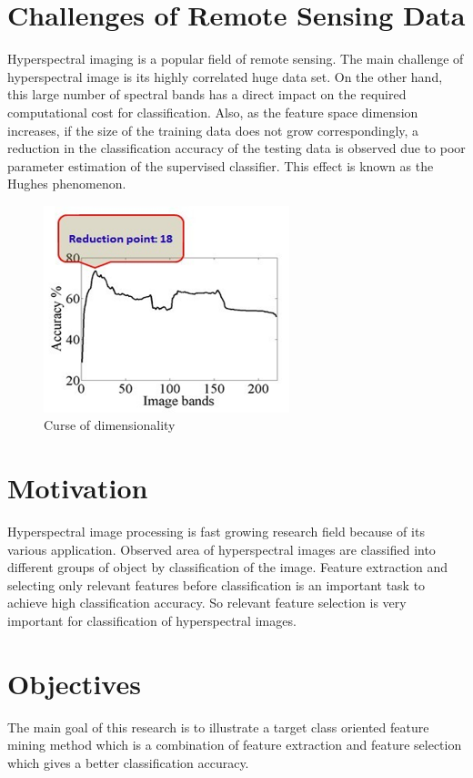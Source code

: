 \documentclass[document.tex]{subfiles}
\begin{document}
\section{Challenges of Remote Sensing Data}
\noindent Hyperspectral imaging is a popular field of remote sensing. The main challenge of hyperspectral image is its highly correlated huge data set. On the other hand, this large number of spectral bands has a direct impact on the required computational cost for classification. Also, as the
feature space dimension increases, if the size of the training data does not grow correspondingly, a reduction in the classification accuracy of the testing data is observed due to poor parameter estimation of the supervised classifier. This effect is known as the Hughes phenomenon.
\begin{figure}[H]
	\begin{center}
		\includegraphics[height=6.0cm]{imgs/curse.png}
	\end{center}
	\caption{Curse of dimensionality}
	\label{fig: Curse of dimensionality}
\end{figure}

\section{Motivation}
\noindent Hyperspectral image processing is fast growing research field because of its various application. Observed area of hyperspectral images are classified into different groups of object by classification of the image. Feature extraction and selecting only relevant features before classification is an important task to achieve high classification accuracy. So relevant feature selection is very important for classification of hyperspectral images. 

\section{Objectives}
\noindent The main goal of this research is to illustrate a target class oriented feature mining method which is a combination of feature extraction and feature selection which gives a better classification accuracy. 
\end{document}
